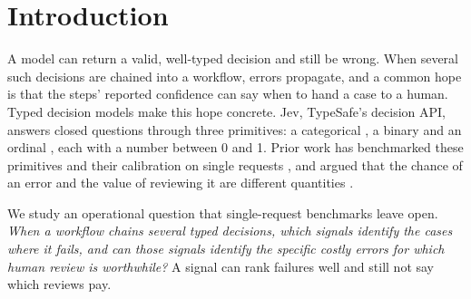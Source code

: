 \section{Introduction}

A model can return a valid, well-typed decision and still be wrong. When
several such decisions are chained into a workflow, errors propagate, and
a common hope is that the steps' reported confidence can say when to hand
a case to a human. Typed decision models make this hope concrete. Jev,
TypeSafe's decision API, answers closed questions through three
primitives: a categorical \choice{}, a binary \noul{} and an ordinal
\score{}, each with a number between 0 and 1. Prior work has benchmarked
these primitives and their calibration on single requests
\citep{deusser2026jev,meng2026jevaudit,denney2026jev}, and argued that
the chance of an error and the value of reviewing it are different
quantities \citep{park2026riskreview}.

We study an operational question that single-request benchmarks leave
open. \emph{When a workflow chains several typed decisions, which
signals identify the cases where it fails, and can those signals identify
the specific costly errors for which human review is worthwhile?} A
signal can rank failures well and still not say which reviews pay.

